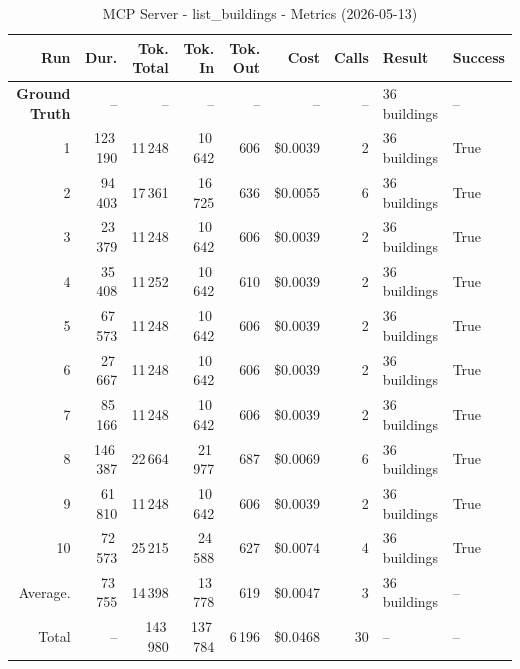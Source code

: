 \documentclass[a4paper,11pt]{article}
\begin{document}
\begin{table}[ht]
\centering
\scriptsize
\caption{MCP Server - list\_buildings - Metrics (2026-05-13)}
\label{tab:mcp\_list\_buildings\_metrics\_2026-05-13}
\begin{tabular}{r r r r r r r p{3cm} l}
\hline
Run & Dur. & Tok. Total & Tok. In & Tok. Out & Cost & Calls & Result & Success \\
\hline
\textbf{Ground Truth} & -- & -- & -- & -- & -- & -- & 36 buildings & -- \\
\hline
1 & 123\,190 & 11\,248 & 10\,642 & 606 & \$0.0039 & 2 & 36 buildings & True \\
2 & 94\,403 & 17\,361 & 16\,725 & 636 & \$0.0055 & 6 & 36 buildings & True \\
3 & 23\,379 & 11\,248 & 10\,642 & 606 & \$0.0039 & 2 & 36 buildings & True \\
4 & 35\,408 & 11\,252 & 10\,642 & 610 & \$0.0039 & 2 & 36 buildings & True \\
5 & 67\,573 & 11\,248 & 10\,642 & 606 & \$0.0039 & 2 & 36 buildings & True \\
6 & 27\,667 & 11\,248 & 10\,642 & 606 & \$0.0039 & 2 & 36 buildings & True \\
7 & 85\,166 & 11\,248 & 10\,642 & 606 & \$0.0039 & 2 & 36 buildings & True \\
8 & 146\,387 & 22\,664 & 21\,977 & 687 & \$0.0069 & 6 & 36 buildings & True \\
9 & 61\,810 & 11\,248 & 10\,642 & 606 & \$0.0039 & 2 & 36 buildings & True \\
10 & 72\,573 & 25\,215 & 24\,588 & 627 & \$0.0074 & 4 & 36 buildings & True \\
\hline
Average. & 73\,755 & 14\,398 & 13\,778 & 619 & \$0.0047 & 3 & 36 buildings & -- \\
Total & -- & 143\,980 & 137\,784 & 6\,196 & \$0.0468 & 30 & -- & -- \\
\hline
\end{tabular}
\end{table}

\clearpage
\end{document}
